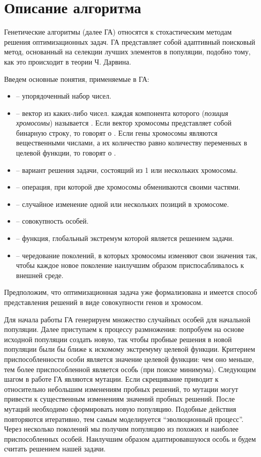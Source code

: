 \section{Описание алгоритма}
Генетические алгоритмы (далее ГА) относятся к стохастическим методам решения оптимизационных задач. ГА представляет собой адаптивный поисковый метод, основанный на селекции лучших элементов в популяции, подобно тому, как это происходит в теории Ч. Дарвина.

Введем основные понятия, применяемые в ГА:
\begin{itemize}
	\item {} -- упорядоченный набор чисел.
	\item {} -- вектор из каких-либо чисел. каждая компонента которого (\textit{позиция хромосомы}) называется . Если вектор хромосомы представляет собой бинарную строку, то говорят о . Если гены хромосомы являются вещественными числами, а их количество равно количеству переменных в целевой функции, то говорят о . \cite{mathGA}
	\item {} -- вариант решения задачи, состоящий из 1 или нескольких хромосомы.
	\item {} -- операция, при которой две хромосомы обмениваются своими частями.
	\item {} -- случайное изменение одной или нескольких позиций в хромосоме.
	\item {} -- совокупность особей.
	\item {} -- функция, глобальный экстремум которой является решением задачи.
	\item {} -- чередование поколений, в которых хромосомы изменяют свои значения так, чтобы каждое новое поколение наилучшим образом приспосабливалось к внешней среде.
\end{itemize}

Предположим, что оптимизационная задача уже формализована и имеется способ представления решений в виде совокупности генов и хромосом.

Для начала работы ГА генерируем множество случайных особей для начальной популяции. Далее приступаем к процессу размножения: попробуем на основе исходной популяции создать новую, так чтобы пробные решения в новой популяции были бы ближе к искомому экстремуму целевой функции. Критерием приспособленности особи является значение целевой функции: чем оно меньше, тем более приспособленной является особь (при поиске минимума). Следующим шагом в работе ГА являются мутации. Если скрещивание приводит к относительно небольшим изменениям пробных решений, то мутации могут привести к существенным изменениям значений пробных решений. После мутаций необходимо сформировать новую популяцию. Подобные действия повторяются итеративно, тем самым моделируется ``эволюционный процесс''. Через несколько поколений мы получим популяцию из похожих и наиболее приспособленных особей. Наилучшим образом адаптировавшуюся особь и будем считать решением нашей задачи.

